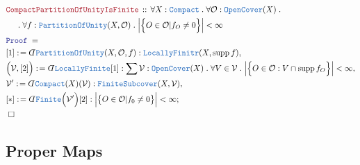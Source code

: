 \documentclass[12pt]{scrartcl}
\newcommand{\TYPE}[1]{\textcolor{NavyBlue}{\mathtt{#1}}}
\newcommand{\LOGIC}[1]{\textcolor{Blue}{\mathtt{#1}}}
\newcommand{\THM}[1]{\textcolor{Maroon}{\mathtt{#1}}}
\renewcommand{\.}{\; . \;}
\newcommand{\de}{: \kern 0.1pc =}
\newcommand{\Theorem}[2]{& \THM{#1} \, :: \, #2 \\ & \Proof = \\ }
\newcommand{\NewLine}{\\ & \kern 1pc}
\newcommand{\Page}[1]{ \begin{align*} #1 \end{align*}   }
\newcommand{ \bd }{ \ByDef }
\DeclareMathOperator*{\supp}{supp}
\newcommand{\Say}[3]{& #1 \de #2 : #3, \\}
\newcommand{\Conclude}[3]{& #1 \de #2 : #3; \\}
\newcommand{\QED}{\; \square}
\newcommand{\EndProof}{& \QED \\}
\newcommand{\ByDef}{\rotatebox[origin=c]{-180}{$D$}}%
\newcommand{\Proof}{\LOGIC{Proof} \; }
\begin{document}
\Page{
	\Theorem{CompactPartitionOfUnityIsFinite}
	{
		\forall X : \TYPE{Compact} \.
		\forall \mathcal{O} : \TYPE{OpenCover}(X) \. \NewLine \. 
		\forall f : \TYPE{PartitionOfUnity}(X,\mathcal{O}) \.
		\Big|\Big\{ O \in \mathcal{O} | f_O \neq 0   \Big\}\Big| <\infty
	}
	\Say{[1]}{\bd \TYPE{PartitionOfUnity}(X,\mathcal{O},f)}
	{
		\TYPE{LocallyFinitr}(X,\supp f)
	}
	\Say{\Big(\mathcal{V},[2]\Big)}
	{
		\bd \TYPE{LocallyFinite}[1]
	}
	{
		\sum \mathcal{V}  : \TYPE{OpenCover}(X) \.
		\forall V \in \mathcal{V} \.
		\Big|\Big\{ O \in \mathcal{O} : V \cap \supp f_O \Big\}\Big| < \infty
	}
	\Say{\mathcal{V}'}{\bd \TYPE{Compact}(X)(\mathcal{V})}
	{
		\TYPE{FiniteSubcover}(X,\mathcal{V})
	}
	\Conclude{[*]}{\bd \TYPE{Finite}\Big(\mathcal{V}'\Big)[2]}
	{
		\Big|\big\{ O \in \mathcal{O} | f_0 \neq 0 \big\}\Big| < \infty
	}
	\EndProof
}
\newpage
\subsection{Proper Maps}
\end{document}
